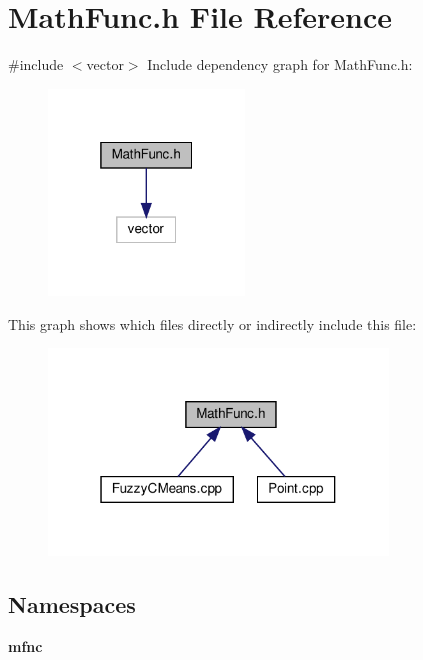 \section{Math\+Func.\+h File Reference}
\label{_math_func_8h}
{\ttfamily \#include $<$vector$>$}\newline
Include dependency graph for Math\+Func.\+h\+:
\nopagebreak
\begin{figure}[H]
\begin{center}
\leavevmode
\includegraphics[width=148pt]{_math_func_8h__incl}
\end{center}
\end{figure}
This graph shows which files directly or indirectly include this file\+:
\nopagebreak
\begin{figure}[H]
\begin{center}
\leavevmode
\includegraphics[width=256pt]{_math_func_8h__dep__incl}
\end{center}
\end{figure}
\subsection*{Namespaces}
\begin{DoxyCompactItemize}
\item 
 \textbf{ mfnc}
\end{DoxyCompactItemize}
